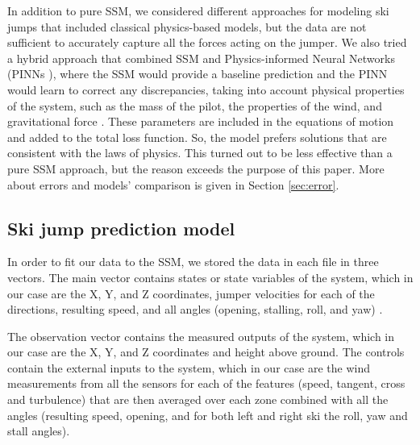 \documentclass[sigconf,natbib=false, language=english]{acmart}
\begin{document}

In addition to pure SSM, we considered different approaches for modeling ski jumps that included classical physics-based models, but the data are not sufficient to accurately capture all the forces acting on the jumper.
We also tried a hybrid approach that combined SSM and Physics-informed Neural Networks (PINNs \cite{StatQuest_NN_YouTube}), where
the SSM would provide a baseline prediction and the PINN would learn to correct any discrepancies, taking into account physical properties of the system, such as the mass of the pilot, the properties of the wind, and gravitational force \cite{Cai2021_PINN_FluidMechanics}. 
These parameters are included in the equations of motion and added to the total loss function. 
So, the model prefers solutions that are consistent with the laws of physics. This
turned out to be less effective than a pure SSM approach, but the reason exceeds the purpose of this paper. More about errors and models' comparison is given in Section \ref{sec:error}.


\subsection{Ski jump prediction model}

In order to fit our data to the SSM, we stored the data in each file in three vectors.
The main vector contains states or state variables of the system, which in our case are the
X, Y, and Z coordinates, jumper velocities for each of the directions, resulting speed, and all angles (opening, stalling, roll, and yaw) \cite{CERN_SkiJump_Physics}.

The observation vector contains the measured outputs of the
system, which in our case are the X, Y, and Z coordinates and
height above ground. The controls contain the external inputs to
the system, which in our case are the wind measurements from
all the sensors for each of the features (speed, tangent, cross and
turbulence) that are then averaged over each zone combined with
all the angles (resulting speed, opening, and for both left and right
ski the roll, yaw and stall angles).
\end{document}
